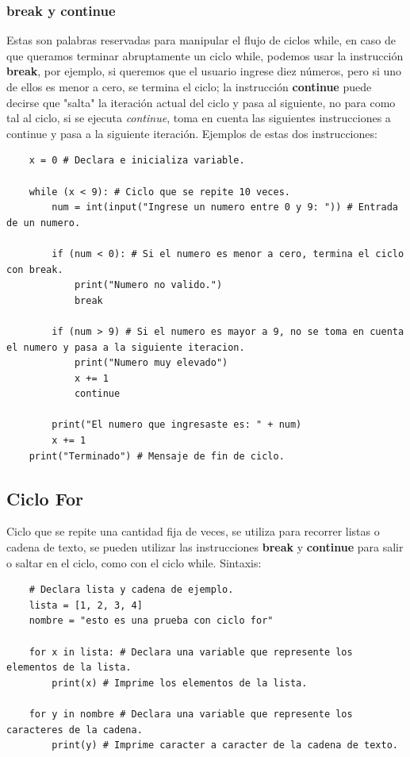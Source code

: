 \subsubsection{break y continue}
\hspace{0.55cm}Estas son palabras reservadas para manipular el flujo de ciclos while, en caso de que queramos terminar abruptamente un ciclo while, podemos usar la instrucción \textbf{break}, por ejemplo, si queremos que el usuario ingrese diez números, pero si uno de ellos es menor a cero, se termina el ciclo; la instrucción \textbf{continue} puede decirse que "salta" la iteración actual del ciclo y pasa al siguiente, no para como tal al ciclo, si se ejecuta \textit{continue}, toma en cuenta las siguientes instrucciones a continue y pasa a la siguiente iteración. Ejemplos de estas dos instrucciones:
\begin{lstlisting}
	x = 0 # Declara e inicializa variable.
	
	while (x < 9): # Ciclo que se repite 10 veces.
		num = int(input("Ingrese un numero entre 0 y 9: ")) # Entrada de un numero.
		
		if (num < 0): # Si el numero es menor a cero, termina el ciclo con break.
			print("Numero no valido.")
			break
		
		if (num > 9) # Si el numero es mayor a 9, no se toma en cuenta el numero y pasa a la siguiente iteracion.
			print("Numero muy elevado")
			x += 1
			continue

		print("El numero que ingresaste es: " + num)
		x += 1
	print("Terminado") # Mensaje de fin de ciclo.
\end{lstlisting}


\subsection{Ciclo For}
\hspace{0.55cm}Ciclo que se repite una cantidad fija de veces, se utiliza para recorrer listas o cadena de texto, se pueden utilizar las instrucciones \textbf{break} y \textbf{continue} para salir o saltar en el ciclo, como con el ciclo while. Sintaxis:
\begin{lstlisting}
	# Declara lista y cadena de ejemplo.
	lista = [1, 2, 3, 4]
	nombre = "esto es una prueba con ciclo for"
	
	for x in lista: # Declara una variable que represente los elementos de la lista.
		print(x) # Imprime los elementos de la lista.
		
	for y in nombre # Declara una variable que represente los caracteres de la cadena.
		print(y) # Imprime caracter a caracter de la cadena de texto.
\end{lstlisting}


